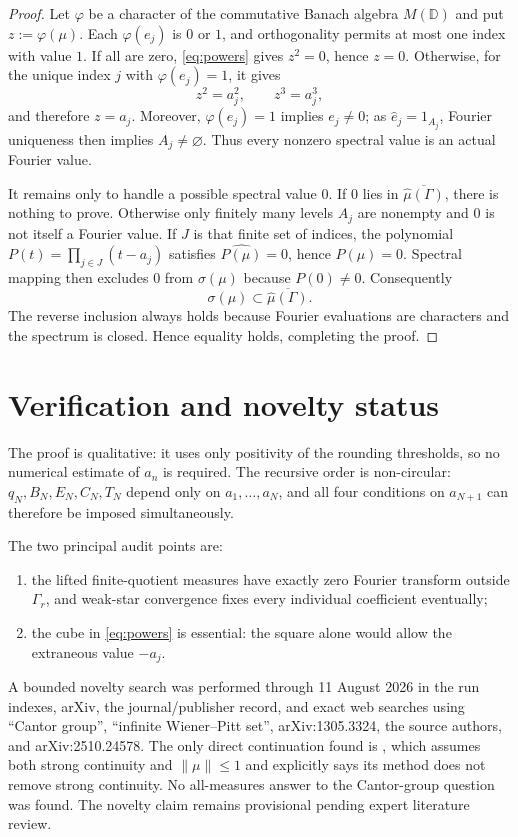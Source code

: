 \documentclass[11pt]{article}
\newcommand{\D}{\mathbb D}
\newcommand{\M}{M}
\newcommand{\wh}{\widehat}
\begin{document}
\begin{proof}
Let $\varphi$ be a character of the commutative Banach algebra $\M(\D)$
and put $z:=\varphi(\mu)$.  Each $\varphi(e_j)$ is $0$ or $1$, and
orthogonality permits at most one index with value $1$.  If all are zero,
\eqref{eq:powers} gives $z^2=0$, hence $z=0$.  Otherwise, for the unique
index $j$ with $\varphi(e_j)=1$, it gives
\[
 z^2=a_j^2,
 \qquad z^3=a_j^3,
\]
and therefore $z=a_j$.  Moreover, $\varphi(e_j)=1$ implies $e_j\ne0$;
as $\wh e_j=1_{A_j}$, Fourier uniqueness then implies $A_j\ne\varnothing$.
Thus every nonzero spectral value is an actual Fourier value.

It remains only to handle a possible spectral value $0$.  If $0$ lies in
$\overline{\wh\mu(\Gamma)}$, there is nothing to prove.  Otherwise only
finitely many levels $A_j$ are nonempty and $0$ is not itself a Fourier
value.  If $J$ is that finite set of indices, the polynomial
$P(t)=\prod_{j\in J}(t-a_j)$ satisfies $\wh{P(\mu)}=0$, hence
$P(\mu)=0$.  Spectral mapping then excludes $0$ from $\sigma(\mu)$ because
$P(0)\ne0$.  Consequently
\[
 \sigma(\mu)\subset\overline{\wh\mu(\Gamma)}.
\]
The reverse inclusion always holds because Fourier evaluations are
characters and the spectrum is closed.  Hence equality holds, completing
the proof.
\end{proof}

\section{Verification and novelty status}

The proof is qualitative: it uses only positivity of the rounding thresholds,
so no numerical estimate of $a_n$ is required.  The recursive order is
non-circular: $q_N,B_N,E_N,C_N,T_N$ depend only on
$a_1,\ldots,a_N$, and all four conditions on $a_{N+1}$ can therefore be
imposed simultaneously.

The two principal audit points are:
\begin{enumerate}
\item the lifted finite-quotient measures have exactly zero Fourier transform
outside $\Gamma_r$, and weak-star convergence fixes every individual
coefficient eventually;
\item the cube in \eqref{eq:powers} is essential: the square alone would allow
the extraneous value $-a_j$.
\end{enumerate}

A bounded novelty search was performed through 11 August 2026 in the run
indexes, arXiv, the journal/publisher record, and exact web searches using
``Cantor group'', ``infinite Wiener--Pitt set'', arXiv:1305.3324, the source
authors, and arXiv:2510.24578.  The only direct continuation found is
\cite{OSW}, which assumes both strong continuity and $\|\mu\|\leq1$ and
explicitly says its method does not remove strong continuity.  No all-measures
answer to the Cantor-group question was found.  The novelty claim remains
provisional pending expert literature review.
\end{document}

